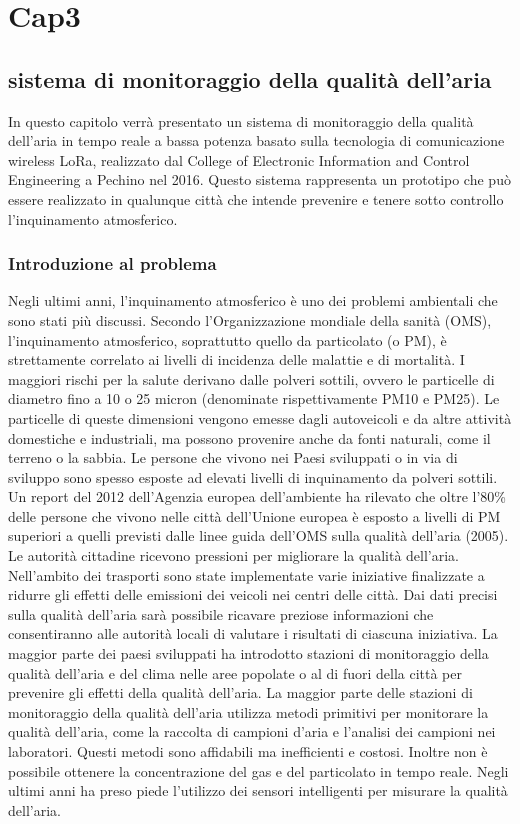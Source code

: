 \documentclass[a4paper]{report} %
\begin{document}
\chapter{Cap3}
\section{sistema di monitoraggio della qualità dell'aria}

In questo capitolo verrà presentato un sistema di monitoraggio della qualità dell'aria in tempo reale a bassa potenza basato sulla tecnologia di comunicazione wireless LoRa, realizzato dal College of Electronic Information and Control Engineering a Pechino nel 2016. Questo sistema rappresenta un prototipo che può essere realizzato in qualunque città che intende prevenire e tenere sotto controllo l'inquinamento atmosferico.

\subsection{Introduzione al problema}
Negli ultimi anni, l'inquinamento atmosferico è uno dei problemi ambientali che sono stati più discussi. Secondo l'Organizzazione mondiale della sanità (OMS), l'inquinamento atmosferico, soprattutto quello da particolato (o PM), è strettamente correlato ai livelli di incidenza delle malattie e di mortalità. I maggiori rischi per la salute derivano dalle polveri sottili, ovvero le particelle di diametro fino a 10 o 25 micron (denominate rispettivamente PM10 e PM25). Le particelle di queste dimensioni vengono emesse dagli autoveicoli e da altre attività domestiche e industriali, ma possono provenire anche da fonti naturali, come il terreno o la sabbia. Le persone che vivono nei Paesi sviluppati o in via di sviluppo sono spesso esposte ad elevati livelli di inquinamento da polveri sottili. Un report del 2012 dell'Agenzia europea dell'ambiente ha rilevato che oltre l'80\% delle persone che vivono nelle città dell'Unione europea è esposto a livelli di PM superiori a quelli previsti dalle linee guida dell'OMS sulla qualità dell'aria (2005). Le autorità cittadine ricevono pressioni per migliorare la qualità dell'aria. Nell'ambito dei trasporti sono state implementate varie iniziative finalizzate a ridurre gli effetti delle emissioni dei veicoli nei centri delle città. Dai dati precisi sulla qualità dell'aria sarà possibile ricavare preziose informazioni che consentiranno alle autorità locali di valutare i risultati di ciascuna iniziativa. La maggior parte dei paesi sviluppati ha introdotto stazioni di monitoraggio della qualità dell'aria e del clima nelle aree popolate o al di fuori della città per prevenire gli effetti della qualità dell'aria. La maggior parte delle stazioni di monitoraggio della qualità dell'aria utilizza metodi primitivi per monitorare la qualità dell'aria, come la raccolta di campioni d'aria e l'analisi dei campioni nei laboratori. Questi metodi sono affidabili ma inefficienti e costosi. Inoltre non è possibile ottenere la concentrazione del gas e del particolato in tempo reale. Negli ultimi anni ha preso piede l'utilizzo dei sensori intelligenti per misurare la qualità dell'aria.
\end{document}
